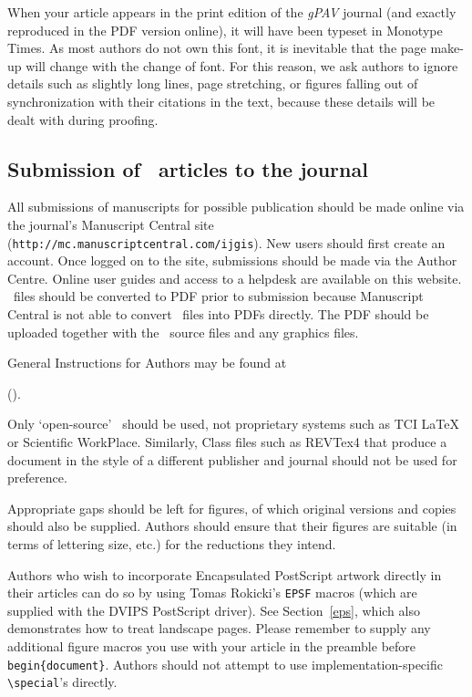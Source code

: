 \documentclass[]{tGIS2e}
\begin{document}
When your article appears in the print edition of the {\it gPAV} journal (and exactly reproduced in the PDF
version online), it will have been typeset in Monotype Times. As most authors do not own this font, it is inevitable that the page make-up will change with the change of font. For this reason, we ask authors to ignore details such as slightly long lines, page stretching, or figures falling out of synchronization with their citations in the text, because these details will be dealt with during proofing.

\subsection{Submission of \LaTeXe\ articles to the journal}\label{S1.2}

All submissions of manuscripts for possible publication should be made online via the journal's Manuscript Central site ({\tt{http://mc.manuscriptcentral.com/ijgis}}). New users should first create an account. Once logged on to the site, submissions should be made via the Author Centre. Online user guides and access to a helpdesk are available on this website. \LaTeXe\ files should be converted to PDF prior to submission because Manuscript Central is not able to convert \LaTeXe\ files into PDFs directly. The PDF should be uploaded together with the \LaTeXe\ source files and any graphics files.

General Instructions for Authors may be found at
\begin{center}().\end{center}

Only `open-source' \LaTeXe\ should be used, not proprietary systems such as TCI LaTeX or Scientific WorkPlace. Similarly, Class files such as REVTex4 that produce a document in the style of a different publisher and journal should not be used for preference.

Appropriate gaps should be left for figures, of which original versions and copies should also be supplied.
Authors should ensure that their figures are suitable (in terms of lettering size, etc.) for the reductions they
intend.

Authors who wish to incorporate Encapsulated PostScript artwork directly in their articles can do so by using
Tomas Rokicki's {\tt EPSF} macros (which are supplied with the DVIPS PostScript driver). See Section~\ref{eps},
which also demonstrates how to treat landscape pages. Please remember to supply any additional figure macros you
use with your article in the preamble before \verb"begin{document}". Authors should not attempt to use
implementation-specific \verb"\special"'s directly.
\end{document}
